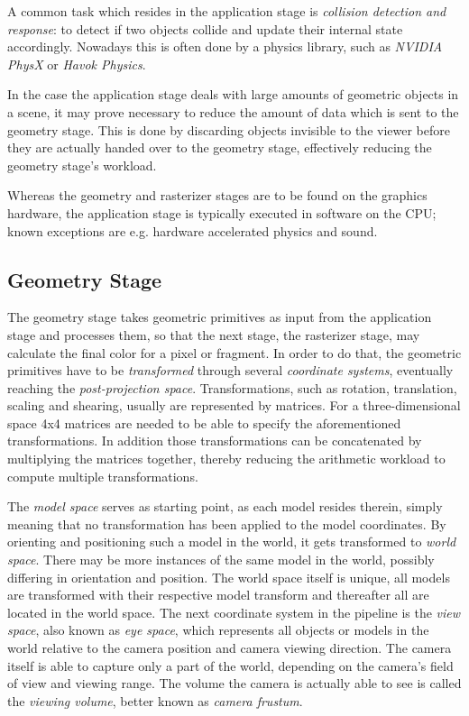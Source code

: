A common task which resides in the application stage is \textit{collision
detection and response}: to detect if two objects collide and update their
internal state accordingly. Nowadays this is often done by a physics library,
such as \textit{NVIDIA PhysX}\cite{misc:ageia-physx} or \textit{Havok
Physics}\cite{misc:havok}.

In the case the application stage deals with large amounts of geometric
objects in a scene, it may prove necessary to reduce the amount of data which
is sent to the geometry stage. This is done by discarding objects invisible to
the viewer before they are actually handed over to the geometry stage,
effectively reducing the geometry stage's workload.

Whereas the geometry and rasterizer stages are to be found on the graphics
hardware, the application stage is typically executed in software on the CPU;
known exceptions are e.g. hardware accelerated physics and sound.

\subsection{Geometry Stage}
The geometry stage takes geometric primitives as input from the application
stage and processes them, so that the next stage, the rasterizer stage, may
calculate the final color for a pixel or fragment. In order to do that, the
geometric primitives have to be \textit{transformed} through several
\textit{coordinate systems}, eventually reaching the \textit{post-projection
space}. Transformations, such as rotation, translation, scaling and shearing,
usually are represented by matrices. For a three-dimensional space 4x4 matrices
are needed to be able to specify the aforementioned transformations. In
addition those transformations can be concatenated by multiplying the matrices
together, thereby reducing the arithmetic workload to compute multiple
transformations.

The \textit{model space} serves as starting point, as each model resides
therein, simply meaning that no transformation has been applied to the model
coordinates. By orienting and positioning such a model in the world, it gets
transformed to \textit{world space}. There may be more instances of the same
model in the world, possibly differing in orientation and position. The world
space itself is unique, all models are transformed with their respective model
transform and thereafter all are located in the world space. The next
coordinate system in the pipeline is the \textit{view space}, also known as
\textit{eye space}, which represents all objects or models in the world relative
to the camera position and camera viewing direction. The camera itself is able
to capture only a part of the world, depending on the camera's field of view
and viewing range. The volume the camera is actually able to see is called the
\textit{viewing volume}, better known as \textit{camera frustum}.

